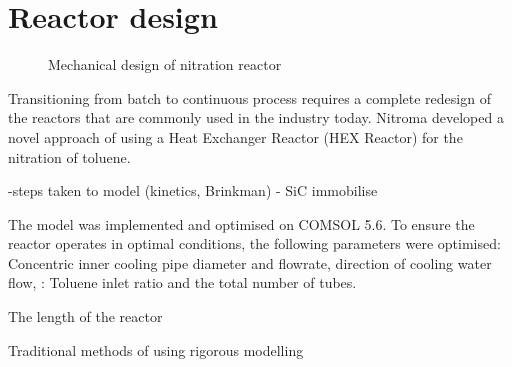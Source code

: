 \section*{Reactor design}
\begin{figure}[h]
    \centering
    \caption{Mechanical design of nitration reactor}
    \label{fig:comsol-S4-CW-X-T}
\end{figure}

Transitioning from batch to continuous process requires a complete redesign of the reactors that are commonly used in the industry today. Nitroma developed a novel approach of using a Heat Exchanger Reactor (HEX Reactor) for the nitration of toluene.

-steps taken to model (kinetics, Brinkman) 
- SiC immobilise

The model was implemented and optimised on COMSOL 5.6. To ensure the reactor operates in optimal conditions, the following parameters were optimised: Concentric inner cooling pipe diameter and flowrate, direction of cooling water flow,  : Toluene inlet ratio and the total number of tubes.

The length of the reactor

Traditional methods of using 
rigorous modelling

